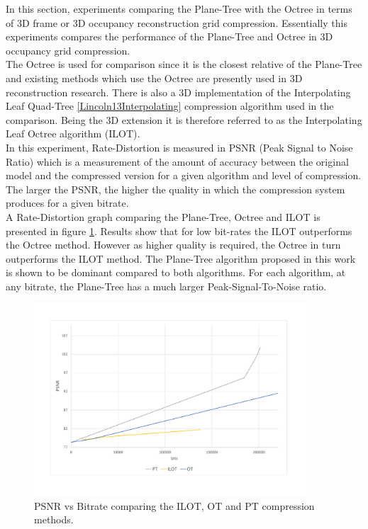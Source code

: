 
In this section, experiments comparing the Plane-Tree with the Octree in terms of 3D frame or 3D occupancy reconstruction grid compression. Essentially this experiments compares the performance of the Plane-Tree and Octree in 3D occupancy grid compression. \\

The Octree is used for comparison since it is the closest relative of the Plane-Tree and existing methods which use the Octree are presently used in 3D reconstruction research. There is also a 3D implementation of the Interpolating Leaf Quad-Tree \ref{Lincoln13Interpolating} compression algorithm used in the comparison. Being the 3D extension it is therefore referred to as the Interpolating Leaf Octree algorithm (ILOT). \\

In this experiment, Rate-Distortion is measured in PSNR (Peak Signal to Noise Ratio) which is a measurement of the amount of accuracy between the original model and the compressed version for a given algorithm and level of compression. The larger the PSNR, the higher the quality in which the compression system produces for a given bitrate. \\

A Rate-Distortion graph comparing the Plane-Tree, Octree and ILOT is presented in figure \ref{fig:3DReconCompression1}. Results show that for low bit-rates the ILOT outperforms the Octree method. However as higher quality is required, the Octree in turn outperforms the ILOT method. The Plane-Tree algorithm proposed in this work is shown to be dominant compared to both algorithms. For each algorithm, at any bitrate, the Plane-Tree has a much larger Peak-Signal-To-Noise ratio. \\

\begin{figure}[!htb]
\centering
\includegraphics[width=4.0in]{images/results/compression/psnr1}
\caption{PSNR vs Bitrate comparing the ILOT, OT and PT compression methods.}
\label{fig:3DReconCompression1}
\end{figure}

